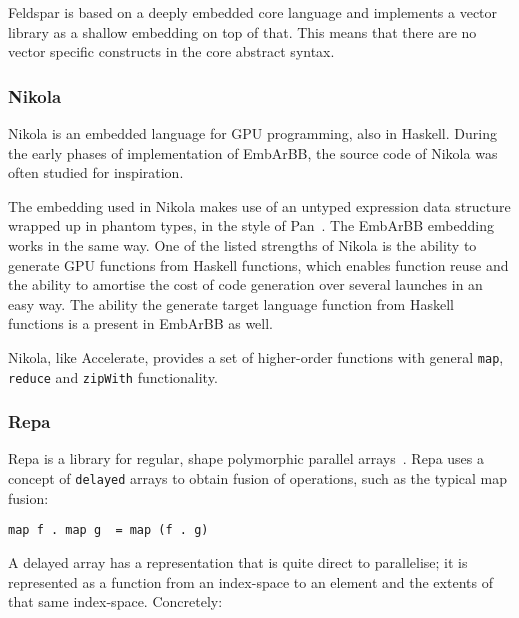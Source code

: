 Feldspar is based on a deeply embedded core language and implements 
a vector library as a shallow embedding on top of that. 
This means that there are no vector specific 
constructs in the core abstract syntax. 




\subsubsection{Nikola} 
Nikola is an embedded language for GPU programming, also
in Haskell.  
During the early phases of implementation of EmbArBB, the source code of 
Nikola was often studied for inspiration.

The embedding used in Nikola makes use of an untyped expression 
data structure wrapped up in phantom types, in the style of Pan~.
The EmbArBB embedding works in the same way. 
One of the listed strengths of Nikola is the ability to generate GPU functions 
from Haskell functions, which enables function reuse and the ability to 
amortise the cost of code generation over several launches in an easy 
way. The ability the generate target language function from Haskell functions 
is a present in EmbArBB as well. 

Nikola, like Accelerate, provides a set of higher-order functions with
general {\tt map}, {\tt reduce} and {\tt zipWith} functionality.

\subsubsection{Repa} 
Repa is a library for regular, shape polymorphic parallel arrays~. Repa 
uses a concept of {\tt delayed} arrays to obtain fusion of operations, such as the 
typical map fusion:
\begin{verbatim}
map f . map g  = map (f . g)
\end{verbatim} 
A delayed array 
has a representation that is quite direct to parallelise; it is represented 
as a function from an index-space to an element and the extents of that same 
index-space. Concretely: 

